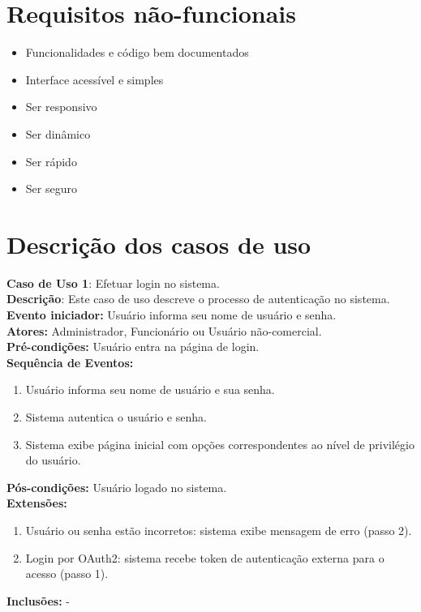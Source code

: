 \documentclass[]{politex}
\begin{document}
\section{Requisitos não-funcionais}
\begin{itemize}
\item Funcionalidades e código bem documentados
\item Interface acessível e simples
\item Ser responsivo
\item Ser dinâmico
\item Ser rápido
\item Ser seguro   
\end{itemize}

\section{Descrição dos casos de uso}

\noindent \textbf{Caso de Uso 1}: Efetuar login no sistema. \\
\textbf{Descrição}: Este caso de uso descreve o processo de autenticação no sistema. \\
\textbf{Evento iniciador:} Usuário informa seu nome de usuário e senha. \\
\textbf{Atores:} Administrador, Funcionário ou Usuário não-comercial. \\
\textbf{Pré-condições:} Usuário entra na página de login. \\
\textbf{Sequência de Eventos:}
\begin{enumerate}
\item Usuário informa seu nome de usuário e sua senha.
\item Sistema autentica o usuário e senha.
\item Sistema exibe página inicial com opções correspondentes ao nível de privilégio do usuário.
\end{enumerate}
\textbf{Pós-condições:} Usuário logado no sistema. \\
\textbf{Extensões:} 
\begin{enumerate}
\item Usuário ou senha estão incorretos: sistema exibe mensagem de erro (passo 2).
\item Login por OAuth2: sistema recebe token de autenticação externa para o acesso (passo 1). 
\end{enumerate}
\textbf{Inclusões:} - \\
\end{document}
